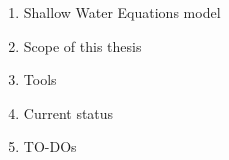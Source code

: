 





\begin{frame}
    
    \begin{enumerate}
    \item Shallow Water Equations model \vspace{0.5cm}
    \item Scope of this thesis\vspace{0.5cm}
    \item Tools\vspace{0.5cm}
    \item Current status\vspace{0.5cm}
    \item TO-DOs
    \end{enumerate}



\end{frame}
\clearpage


